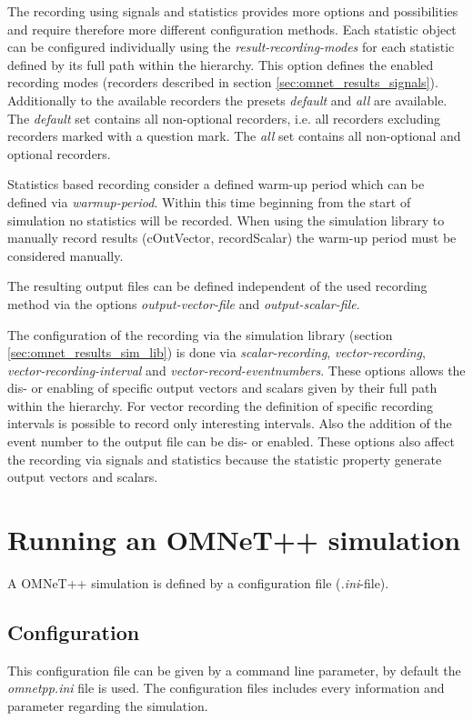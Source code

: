 The recording using signals and statistics provides more options and possibilities and require therefore more different configuration methods.
Each statistic object can be configured individually using the \emph{result-recording-modes} for each statistic defined by its full path within the hierarchy.
This option defines the enabled recording modes (recorders described in section \ref{sec:omnet_results_signals}).
Additionally to the available recorders the presets \emph{default} and \emph{all} are available.
The \emph{default} set contains all non-optional recorders, i.e. all recorders excluding recorders marked with a question mark.
The \emph{all} set contains all non-optional and optional recorders. \cite[section 12.2.1]{omnet_manual}

Statistics based recording consider a defined warm-up period which can be defined via \emph{warmup-period}.
Within this time beginning from the start of simulation no statistics will be recorded.
When using the simulation library to manually record results (cOutVector, recordScalar) the warm-up period must be considered manually. \cite[section 12.2.2]{omnet_manual}

The resulting output files can be defined independent of the used recording method via the options \emph{output-vector-file} and \emph{output-scalar-file}. \cite[section 12.2.3]{omnet_manual}

The configuration of the recording via the simulation library (section \ref{sec:omnet_results_sim_lib}) is done via \emph{scalar-recording}, \emph{vector-recording}, \emph{vector-recording-interval} and \emph{vector-record-eventnumbers}.
These options allows the dis- or enabling of specific output vectors and scalars given by their full path within the hierarchy.
For vector recording the definition of specific recording intervals is possible to record only interesting intervals.
Also the addition of the event number to the output file can be dis- or enabled.
These options also affect the recording via signals and statistics because the statistic property generate output vectors and scalars.

\section{Running an OMNeT++ simulation}
\label{sec:omnet_running}

A OMNeT++ simulation is defined by a configuration file (\emph{.ini}-file).

\subsection{Configuration}
\label{sec:omnet_running_config}
This configuration file can be given by a command line parameter, by default the \emph{omnetpp.ini} file is used.
The configuration files includes every information and parameter regarding the simulation.

